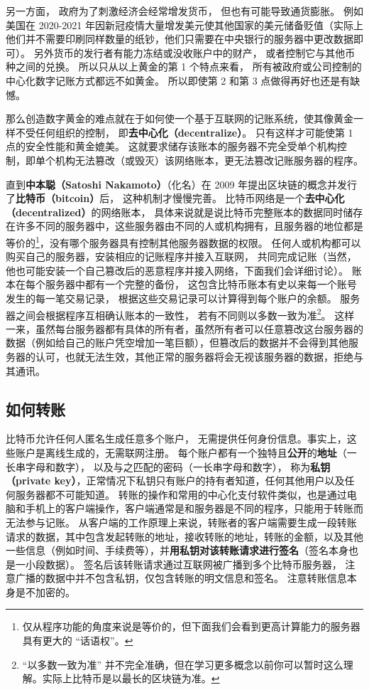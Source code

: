 另一方面， 政府为了刺激经济会经常增发货币， 但也有可能导致通货膨胀。 例如美国在 2020-2021 年因新冠疫情大量增发美元使其他国家的美元储备贬值（实际上他们并不需要印刷同样数量的纸钞，他们只需要在中央银行的服务器中更改数据即可）。 另外货币的发行者有能力冻结或没收账户中的财产， 或者控制它与其他币种之间的兑换。 所以只从以上黄金的第 1 个特点来看， 所有被政府或公司控制的中心化数字记账方式都远不如黄金。 所以即使第 2 和第 3 点做得再好也还是有缺憾。

那么创造数字黄金的难点就在于如何使一个基于互联网的记账系统，使其像黄金一样不受任何组织的控制， 即\textbf{去中心化（decentralize）}。 只有这样才可能使第 1 点的安全性能和黄金媲美。 这就要求储存该账本的服务器不完全受单个机构控制，即单个机构无法篡改（或毁灭）该网络账本，更无法篡改记账服务器的程序。

直到\textbf{中本聪（Satoshi Nakamoto）}（化名）在 2009 年提出区块链的概念并发行了\textbf{比特币（bitcoin）}后， 这种机制才慢慢完善。 比特币网络是一个\textbf{去中心化（decentralized）}的网络账本， 具体来说就是说比特币完整账本的数据同时储存在许多不同的服务器中，这些服务器由不同的人或机构拥有，且服务器的地位都是等价的\footnote{仅从程序功能的角度来说是等价的，但下面我们会看到更高计算能力的服务器具有更大的 “话语权”。}，没有哪个服务器具有控制其他服务器数据的权限。 任何人或机构都可以购买自己的服务器，安装相应的记账程序并接入互联网， 共同完成记账（当然，他也可能安装一个自己篡改后的恶意程序并接入网络，下面我们会详细讨论）。 账本在每个服务器中都有一个完整的备份， 这包含比特币账本有史以来每一个账号发生的每一笔交易记录， 根据这些交易记录可以计算得到每个账户的余额。 服务器之间会根据程序互相确认账本的一致性， 若有不同则以多数一致为准\footnote{“以多数一致为准” 并不完全准确，但在学习更多概念以前你可以暂时这么理解。实际上比特币是以最长的区块链为准。}。 这样一来，虽然每台服务器都有具体的所有者，虽然所有者可以任意篡改这台服务器的数据（例如给自己的账户凭空增加一笔巨额），但篡改后的数据并不会得到其他服务器的认可，也就无法生效，其他正常的服务器将会无视该服务器的数据，拒绝与其通讯。

\subsection{如何转账}
比特币允许任何人匿名生成任意多个账户， 无需提供任何身份信息。事实上，这些账户是离线生成的，无需联网注册。 每个账户都有一个独特且\textbf{公开}的\textbf{地址}（一长串字母和数字）， 以及与之匹配的密码（一长串字母和数字）， 称为\textbf{私钥（private key）}，正常情况下私钥只有账户的持有者知道，任何其他用户以及任何服务器都不可能知道。 转账的操作和常用的中心化支付软件类似，也是通过电脑和手机上的客户端操作，客户端通常是和服务器是不同的程序，只能用于转账而无法参与记账。 从客户端的工作原理上来说，转账者的客户端需要生成一段转账请求的数据，其中包含发起转账的地址，接收转账的地址，转账的金额，以及其他一些信息（例如时间、手续费等），并\textbf{用私钥对该转账请求进行签名}（签名本身也是一小段数据）。 签名后该转账请求通过互联网被广播到多个比特币服务器， 注意广播的数据中并不包含私钥，仅包含转账的明文信息和签名。 注意转账信息本身是不加密的。

